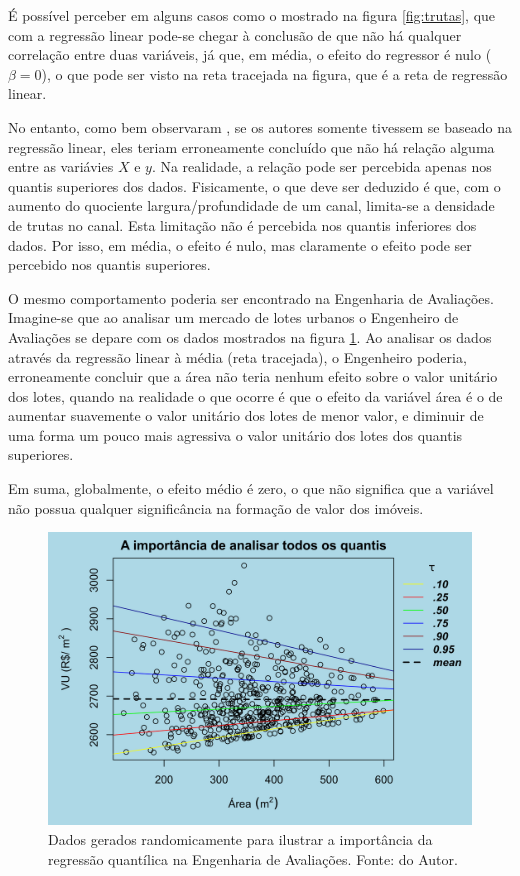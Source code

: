 \documentclass[a4paper, 12pt]{article}
\begin{document}
É possível perceber em alguns casos como o mostrado na figura
\ref{fig:trutas}, que com a regressão linear pode-se chegar à conclusão
de que não há qualquer correlação entre duas variáveis, já que, em
média, o efeito do regressor é nulo (\(\beta = 0\)), o que pode ser
visto na reta tracejada na figura, que é a reta de regressão linear.

No entanto, como bem observaram \textcite[412-413]{QReco}, se os autores
somente tivessem se baseado na regressão linear, eles teriam
erroneamente concluído que não há relação alguma entre as variávies
\(X\) e \(y\). Na realidade, a relação pode ser percebida apenas nos
quantis superiores dos dados. Fisicamente, o que deve ser deduzido é
que, com o aumento do quociente largura/profundidade de um canal,
limita-se a densidade de trutas no canal. Esta limitação não é percebida
nos quantis inferiores dos dados. Por isso, em média, o efeito é nulo,
mas claramente o efeito pode ser percebido nos quantis superiores.

O mesmo comportamento poderia ser encontrado na Engenharia de
Avaliações. Imagine-se que ao analisar um mercado de lotes urbanos o
Engenheiro de Avaliações se depare com os dados mostrados na figura
\ref{fig:urb}. Ao analisar os dados através da regressão linear à média
(reta tracejada), o Engenheiro poderia, erroneamente concluir que a área
não teria nenhum efeito sobre o valor unitário dos lotes, quando na
realidade o que ocorre é que o efeito da variável área é o de aumentar
suavemente o valor unitário dos lotes de menor valor, e diminuir de uma
forma um pouco mais agressiva o valor unitário dos lotes dos quantis
superiores.

Em suma, globalmente, o efeito médio é zero, o que não significa que a
variável não possua qualquer significância na formação de valor dos
imóveis.

\begin{figure}[H]

{\centering \includegraphics[width=1\linewidth]{images/urb-1} 

}

\caption{Dados gerados randomicamente para ilustrar a importância da regressão quantílica na Engenharia de Avaliações. Fonte: do Autor.}\label{fig:urb}
\end{figure}
\end{document}
